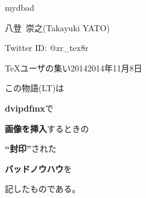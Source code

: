 %
%
\begin{mybgcolor}{mydbad}

\begin{myframe}\color{white}%
  \begin{mycenter}
    {{\large 八登\ 崇之}\quad(Takayuki YATO)}\par
    \smallskip
    {{\small\textcolor{black!25}{Twitter ID:}}
      \textcolor{yellow!75!white}{@zr\_tex8r}}\par
    \smallskip
    {\small{\TeX}ユーザの集い2014\qquad 2014年11月8日}
  \end{mycenter}
\end{myframe}

\newcommand*{\myemph}[1]{\textcolor{mylbad}{\bfseries #1}}
\begin{myframe}\color{white}
  \begin{mycenter}\large
  \begin{minipage}{15em}
  この物語{\small (LT)}は
  \par{}\hspace*{1em}
  \myemph{dvipdfmx}で
  \par{}\hspace*{2em}
  \myemph{画像を挿入}するときの
  \par{}\hspace*{3em}
  {\LARGE\bfseries\textcolor{mybanned!50!white}{“封印”}}された
  \par{}\hspace*{4em}
  \myemph{バッドノウハウ}を
  \par{}\hspace*{5em}
  記したものである。
  \end{minipage}\end{mycenter}
\end{myframe}

\end{mybgcolor}

